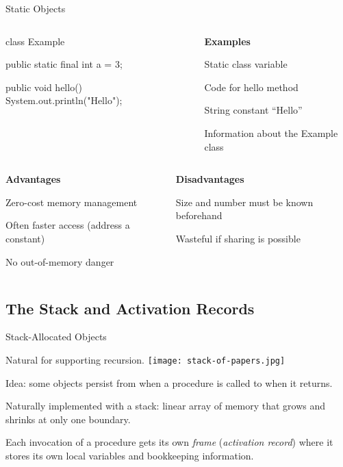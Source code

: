 \documentclass{plt}
\begin{document}
\begin{frame}[fragile]{Static Objects}

\begin{columns}
\begin{column}{0.5\textwidth}
\begin{java}
class Example {
  public static final int a = 3;

  public void hello() {
    System.out.println("Hello");
  }
}
\end{java}
\end{column}
\begin{column}{0.5\textwidth}
\textbf{Examples}

\baselineskip
Static class variable

Code for hello method

String constant ``Hello''

Information about the Example class
\end{column}
\end{columns}

\vspace{\baselineskip}

\begin{columns}[t]
\begin{column}{0.5\textwidth}
\baselineskip
\textbf{Advantages}


Zero-cost memory management

Often faster access (address a constant)

No out-of-memory danger

\end{column}
\begin{column}{0.5\textwidth}
\baselineskip
\textbf{Disadvantages}

Size and number must be known beforehand

Wasteful if sharing is possible
\end{column}
\end{columns}

\end{frame}

\subsection{The Stack and Activation Records}

\begin{frame}{Stack-Allocated Objects}

Natural for supporting recursion. 
\hfill\texttt{[image: stack-of-papers.jpg]}

Idea: some objects persist from when a procedure is called to
when it returns.

Naturally implemented with a stack: linear array of memory that grows
and shrinks at only one boundary.

Each invocation of a procedure gets its own \emph{frame}
(\emph{activation record}) where it stores its own local variables and
bookkeeping information.

\end{frame}
\end{document}
